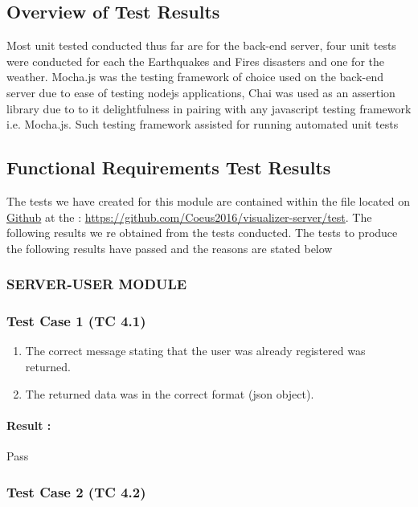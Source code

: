 \subsection{Overview of Test Results}

Most unit tested conducted thus far are for the back-end server, four unit tests were conducted for each the Earthquakes and Fires disasters and one for the weather. Mocha.js was the testing framework of choice used on the back-end server due to ease of testing nodejs applications, Chai was used as an assertion library due to to it delightfulness in pairing with any javascript testing framework i.e. Mocha.js. Such testing framework assisted for running automated unit tests

\subsection{Functional Requirements Test Results}

The tests we have created for this module are contained within the file
located on \href{https://github.com}{Github} at the : \url{https://github.com/Coeus2016/visualizer-server/test}. The following results we re obtained from the tests conducted. The tests to produce the following results have passed and the reasons are stated below \\

\subsubsection*{SERVER-USER MODULE}

\subsubsection{Test Case 1 (TC 4.1)}

\begin{enumerate}
	\item The correct message stating that the user was already registered was returned.
	\item The returned data was in the correct format (json object).
\end{enumerate}

\paragraph{Result :} Pass

\subsubsection{Test Case 2 (TC 4.2)}

